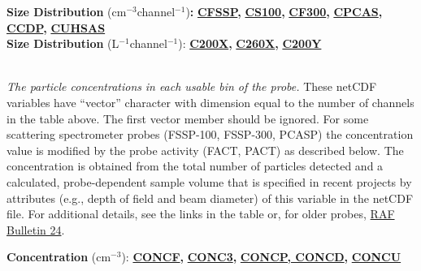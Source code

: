 \begin{hangparagraphs}
\textbf{}%
\noindent\begin{minipage}[t]{1\columnwidth}%
\textbf{Size Distribution} ($\mathrm{cm}{}^{-3}$channel$^{-1}$)\textbf{:}\hypertarget{CFSSP}{}\hypertarget{CS100}{}\hypertarget{CF300}{}\hypertarget{CPCAS}{}\hypertarget{CCDP}{}\hypertarget{CUHSAS}{}\hypertarget{C200X}{}\hypertarget{C260X}{}\hypertarget{C200Y}{}\textbf{
}\textbf{\uline{CFSSP}}\textbf{,
}\textbf{\uline{CS100}}\textbf{}\textbf{,
}\textbf{\uline{CF300}}\textbf{,
}\textbf{\uline{CPCAS}}\textbf{,
}\textbf{\uline{CCDP}}\textbf{,
}\textbf{\uline{CUHSAS}}\\
\textbf{Size Distribution }(L\textbf{$^{-1}$}channel$^{-1}$):\textbf{
}\textbf{\uline{C200X}}\textbf{,
}\textbf{\uline{C260X}}\textbf{,
}\textbf{\uline{C200Y}}%
\end{minipage}\textbf{\label{CUHSAS}}\\
\emph{The particle concentrations}
\emph{in each usable bin of the probe.} These netCDF variables have
``vector'' character with dimension equal to the number of channels
in the table above. The first vector member should be ignored. For
some scattering spectrometer
probes (FSSP-100, FSSP-300, PCASP)
the concentration value is modified by the probe activity (FACT, PACT)
as described below. The concentration is obtained from the total number
of particles detected and a calculated, probe-dependent sample volume
that is specified in recent projects by attributes (e.g., depth of
field and beam diameter) of this variable in the netCDF file. For
additional details, see the links in the table 
or, for older probes, \href{http://www.eol.ucar.edu/raf/Bulletins/bulletin24.html}{RAF Bulletin 24}.

\begin{singlespace}
\textbf{}%
\noindent\begin{minipage}[t]{1\columnwidth}%
\begin{hangparagraphs}
\begin{singlespace}
\textbf{Concentration }(cm$^{-3}$):\hypertarget{CONCF}{}\hypertarget{CONC3}{}\hypertarget{COMCP}{}\hypertarget{CONCD}{}\hypertarget{CONCU}{}\textbf{
}\textbf{\uline{CONCF}}\textbf{,
}\textbf{\uline{CONC3}}\textbf{,
}\textbf{\uline{CONCP, CONCD}}\textbf{,
}\textbf{\uline{CONCU}}


\end{singlespace}
\end{hangparagraphs}
\end{minipage}
\end{singlespace}
\end{hangparagraphs}
